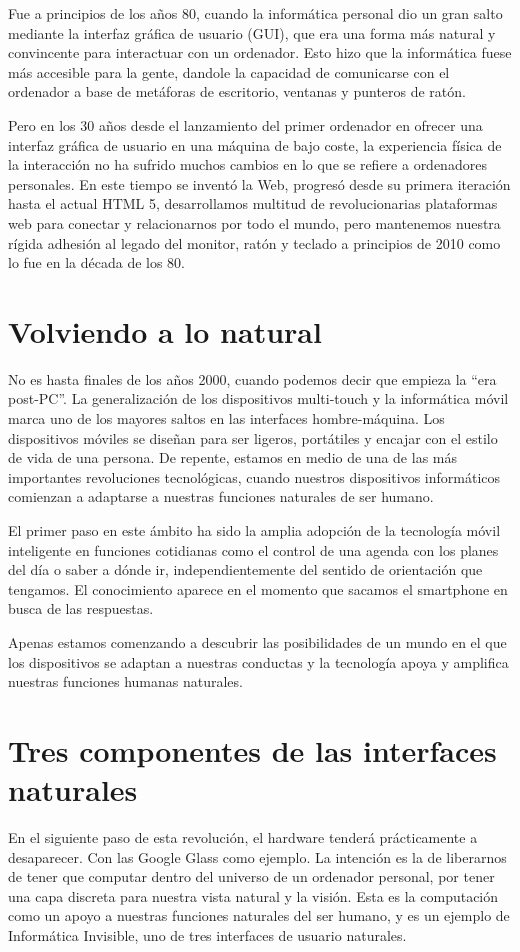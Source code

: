 Fue a principios de los años 80, cuando la informática personal dio un gran salto mediante la interfaz gráfica de usuario (GUI), que era una forma más natural y convincente para interactuar con un ordenador. Esto hizo que la informática fuese más accesible para la gente, dandole la capacidad de comunicarse con el ordenador a base de metáforas de escritorio, ventanas y punteros de ratón.

Pero en los 30 años desde el lanzamiento del primer ordenador en ofrecer una interfaz gráfica de usuario en una máquina de bajo coste, la experiencia física de la interacción no ha sufrido muchos cambios en lo que se refiere a ordenadores personales. En este tiempo se inventó la Web, progresó desde su primera iteración hasta el actual HTML 5, desarrollamos multitud de revolucionarias plataformas web para conectar y relacionarnos por todo el mundo, pero mantenemos nuestra rígida adhesión al legado del monitor, ratón y teclado a principios de 2010 como lo fue en la década de los 80. 

\section{Volviendo a lo natural}

No es hasta finales de los años 2000, cuando podemos decir que empieza la ``era post-PC''. La generalización de los dispositivos multi-touch y la informática móvil marca uno de los mayores saltos en las interfaces hombre-máquina. Los dispositivos móviles se diseñan para ser ligeros, portátiles y encajar con el estilo de vida de una persona. De repente, estamos en medio de una de las más importantes revoluciones tecnológicas, cuando nuestros dispositivos informáticos comienzan a adaptarse a nuestras funciones naturales de ser humano.

El primer paso en este ámbito ha sido la amplia adopción de la tecnología móvil inteligente en funciones cotidianas como el control de una agenda con los planes del día o saber a dónde ir, independientemente del sentido de orientación que tengamos. El conocimiento aparece en el momento que sacamos el smartphone en busca de las respuestas.

Apenas estamos comenzando a descubrir las posibilidades de un mundo en el que los dispositivos se adaptan a nuestras conductas y la tecnología apoya y amplifica nuestras funciones humanas naturales.

\section{Tres componentes de las interfaces naturales}
En el siguiente paso de esta revolución, el hardware tenderá prácticamente a desaparecer. Con las Google Glass como ejemplo. La intención es la de liberarnos de tener que computar dentro del universo de un ordenador personal, por tener una capa discreta para nuestra vista natural y la visión. Esta es la computación como un apoyo a nuestras funciones naturales del ser humano, y es un ejemplo de Informática Invisible, uno de tres interfaces de usuario naturales.


